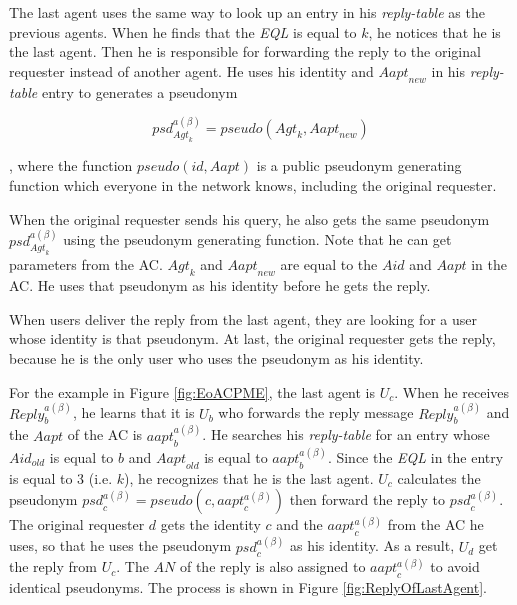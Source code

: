 \documentclass[conference]{IEEEtran}
\begin{document}
The last agent uses the same way to look up an entry in his \textit{reply-table} as the previous agents. When he finds that the \textit{EQL} is equal to $k$, he notices that he is the last agent. Then he is responsible for forwarding the reply to the original requester instead of another agent. He uses his identity and ${Aapt}_{new}$ in his \textit{reply-table} entry to generates a pseudonym

\begin{equation} \label{GrindEQ__ACPPsd} 
{psd}_{{Agt}_k}^{a\left( \beta \right)}=pseudo\left({Agt}_k,{Aapt}_{new}\right)
\end{equation}

, where the function $pseudo\left(id,Aapt\right)$ is a public pseudonym generating function which everyone in the network knows, including the original requester.

When the original requester sends his query, he also gets the same pseudonym ${psd}_{{Agt}_k}^{a\left( \beta \right)}$ using the pseudonym generating function. Note that he can get parameters from the AC. ${Agt}_k$ and ${Aapt}_{new}$ are equal to the $Aid$ and $Aapt$ in the AC. He uses that pseudonym as his identity before he gets the reply.

When users deliver the reply from the last agent, they are looking for a user whose identity is that pseudonym. At last, the original requester gets the reply, because he is the only user who uses the pseudonym as his identity.

For the example in Figure \ref{fig:EoACPME}, the last agent is $U_c$. When he receives ${Reply}^{a\left(\beta\right)}_b$, he learns that it is $U_b$ who forwards the reply message ${Reply}^{a\left(\beta\right)}_b$ and the $Aapt$ of the AC is ${aapt}^{a\left(\beta\right)}_b$. He searches his \textit{reply-table} for an entry whose ${Aid}_{old}$ is equal to $b$ and ${Aapt}_{old}$ is equal to ${aapt}^{a\left(\beta\right)}_b$. Since the \textit{EQL} in the entry is equal to 3 (i.e. $k$), he recognizes that he is the last agent. $U_c$ calculates the pseudonym ${psd}^{a\left(\beta \right)}_c=pseudo\left(c,{aapt}^{a\left(\beta\right)}_c\right)$ then forward the reply to ${psd}^{a\left(\beta\right)}_c$. The original requester $d$ gets the identity $c$ and the ${aapt}^{a\left(\beta \right)}_c$ from the AC he uses, so that he uses the pseudonym ${psd}^{a\left(\beta \right)}_c$ as his identity. As a result, $U_d$ get the reply from $U_c$. The $AN$ of the reply is also assigned to ${aapt}^{a\left(\beta\right)}_c$ to avoid identical pseudonyms. The process is shown in Figure \ref{fig:ReplyOfLastAgent}. 
\end{document}
